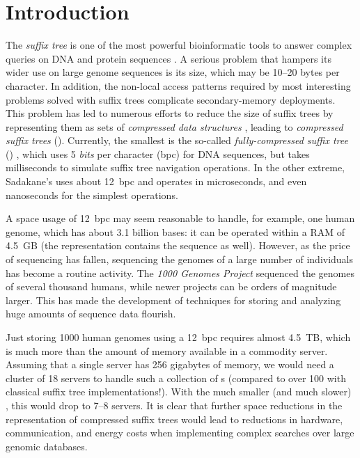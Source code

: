 
\section{Introduction}

The \emph{suffix tree} \cite{Weiner1973} is one of the most powerful bioinformatic tools to
answer complex queries on DNA and protein sequences \cite{Gus97,Ohl13,MBCT15}.
A serious problem that hampers its wider use on large genome sequences is its
size, which may be 10--20 bytes per character. In addition, the non-local
access patterns required by most interesting problems solved with suffix trees
complicate secondary-memory deployments. This problem has led to numerous
efforts to reduce the size of suffix trees by representing them as sets of
\emph{compressed data structures} \cite{Sadakane2007,Fischer2009a,Ohlebusch2009,Ohlebusch2010,Russo2011,Gog2011a,Abeliuk2013,Navarro2014a}, leading to
\emph{compressed suffix trees} (\CST). Currently, the smallest
\CST{} is the so-called \emph{fully-compressed suffix tree} (\FCST)
\cite{Russo2011,Navarro2014a}, which uses 5 \emph{bits} per character (bpc)
for DNA sequences, but takes milliseconds to simulate suffix
tree navigation operations. In the other extreme, Sadakane's \CST{}
\cite{Sadakane2007} uses about 12~bpc and operates in
microseconds, and even nanoseconds for the simplest operations.

A space usage of 12~bpc may seem reasonable to handle, for example, one human
genome, which has about 3.1 billion bases: it can be operated within a
RAM of 4.5~GB (the representation contains the sequence as well). However,
as the price of sequencing has fallen, sequencing the genomes of a large
number of individuals has become a routine activity. The \emph{1000 Genomes
Project} \cite{1000GP} sequenced the genomes of several thousand humans,
while newer projects can be orders of magnitude larger. This has made the
development of techniques for storing and analyzing huge amounts of sequence
data flourish.

Just storing 1000 human genomes using a 12~bpc \CST{} requires almost 4.5~TB, which
is much more than the amount of memory available in a commodity server. Assuming that
a single server has 256 gigabytes of memory, we would need a cluster of 18 servers to
handle such a collection of \CST{}s (compared to over 100 with classical suffix
tree implementations!). With the much smaller (and much slower) \FCST, this would
drop to 7--8 servers. It is clear that further space reductions in the
representation of compressed suffix trees would lead to reductions in hardware, communication,
and energy costs when implementing complex searches over large genomic
databases.

